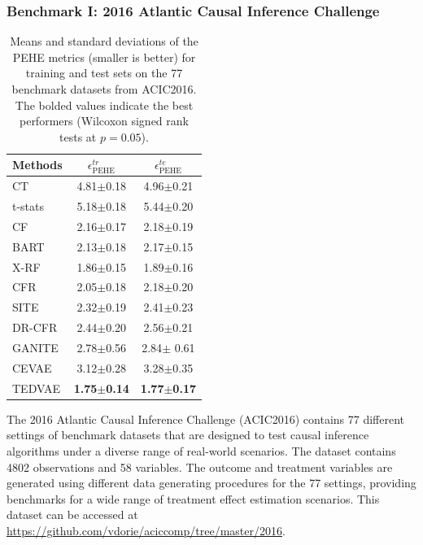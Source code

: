 \documentclass[letterpaper]{article} %
\begin{document}
\subsubsection{Benchmark I: 2016 Atlantic Causal Inference Challenge}


\begin{table}[!t]
	\centering		
	\begin{tabular}{l | c c }
		\hline
		Methods & $\epsilon_{\text{PEHE}}^{tr}$ & $\epsilon_{\text{PEHE}}^{te}$ \\
		\hline
		CT &  4.81$\pm$0.18 & 4.96$\pm$0.21 \\
		t-stats &  5.18$\pm$0.18 & 5.44$\pm$0.20 \\
		\hline
		CF	& 2.16$\pm$0.17 & 2.18$\pm$0.19 \\
		BART & 2.13$\pm$0.18 & 2.17$\pm$0.15 \\
		X-RF & 1.86$\pm$0.15 & 1.89$\pm$0.16   \\
		\hline
		CFR	 & 2.05$\pm$0.18 & 2.18$\pm$0.20 \\
		SITE & 2.32$\pm$0.19 & 2.41$\pm$0.23  \\
		DR-CFR & 2.44$\pm$0.20& 2.56$\pm$0.21 \\
		\hline
		GANITE & 2.78$\pm$0.56 & 2.84$\pm$ 0.61 \\
		CEVAE & 3.12$\pm$0.28 & 3.28$\pm$0.35 \\
		TEDVAE & \textbf{1.75$\pm$0.14} &  \textbf{1.77$\pm$0.17}  \\
		\hline
	\end{tabular}
	\caption{Means and standard deviations of the PEHE metrics (smaller is better) for training and test sets on the 77 benchmark datasets from ACIC2016. The bolded values indicate the best performers (Wilcoxon signed rank tests at $p=0.05$).}
	\label{acic2016}
\end{table}

The 2016 Atlantic Causal Inference Challenge (ACIC2016) \cite{Dorie2019} contains 77 different settings of benchmark datasets that are designed to test causal inference algorithms under a diverse range of real-world scenarios. 
The dataset contains 4802 observations and 58 variables. The outcome and treatment variables are generated using different data generating procedures for the 77 settings, providing benchmarks for a wide range of treatment effect estimation scenarios. This dataset can be accessed at \url{https://github.com/vdorie/aciccomp/tree/master/2016}. 
\end{document}
